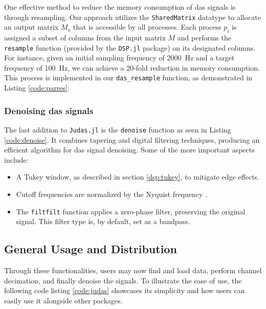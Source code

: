One effective method to reduce the memory consumption of \acrshort{das} signals is through resampling. Our approach utilizes the \texttt{SharedMatrix} datatype to allocate an output matrix $M_o$ that is accessible by all processes. Each process $p_i$ is assigned a subset of columns from the input matrix $M$ and performs the \texttt{resample} function (provided by the \texttt{DSP.jl} package) on its designated columns. For instance, given an initial sampling frequency of \qty{2000}{\hertz} and a target frequency of \qty{100}{\hertz}, we can achieve a 20-fold reduction in memory consumption. This process is implemented in our \texttt{das\_resample} function, as demonstrated in Listing \ref{code:parres}:



\clearpage
\subsubsection{Denoising \acrshort{das} signals}



The last addition to \texttt{Judas.jl} is the \texttt{denoise} function as seen in Listing \ref{code:denoise}. It combines tapering and digital filtering techniques, producing an efficient algorithm for \acrshort{das} signal denoising. Some of the more important aspects include: 

\begin{itemize}
    \item A Tukey window, as described in section \ref{dsp:tukey}, to mitigate edge effects.
    \item Cutoff frequencies are normalized by the Nyquist frequency \cite{schmogrow2012nyquist}.
    \item The \texttt{filtfilt} function applies a zero-phase filter, preserving the original signal. This filter type is, by default, set as a bandpass. 
\end{itemize}

\clearpage
\subsection{General Usage and Distribution}

Through these functionalities, users may now find and load data, perform channel decimation, and finally denoise the signals. To illustrate the ease of use, the following code listing \ref{code:judas} showcases its simplicity and how users can easily use it alongside other packages. \\

